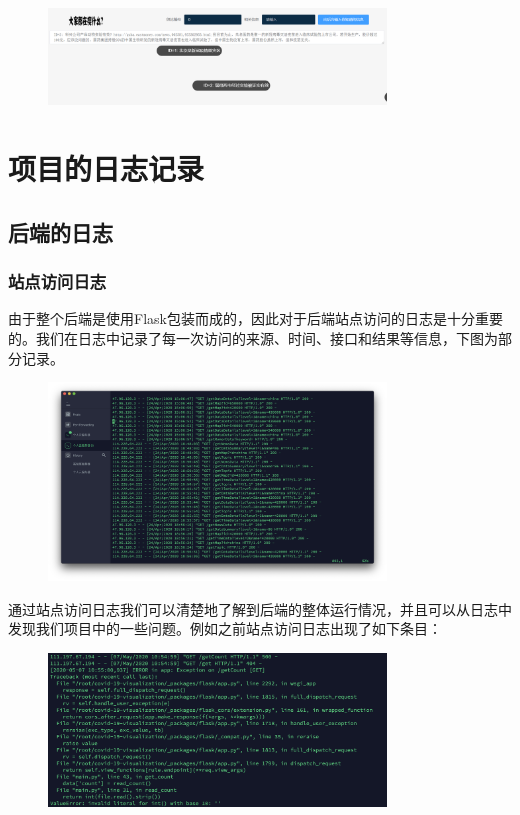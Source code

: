 \documentclass{article}
\begin{document}
\begin{figure}[H]
\centering
\includegraphics[width=0.8\textwidth]{pic7.png}
\end{figure}



\section{项目的日志记录}
\subsection{后端的日志}
\subsubsection{站点访问日志}
由于整个后端是使用Flask包装而成的，因此对于后端站点访问的日志是十分重要的。我们在日志中记录了每一次访问的来源、时间、接口和结果等信息，下图为部分记录。

\begin{figure}[H]
\centering
\includegraphics[width=0.8\textwidth]{pic2.png}
\end{figure}

通过站点访问日志我们可以清楚地了解到后端的整体运行情况，并且可以从日志中发现我们项目中的一些问题。例如之前站点访问日志出现了如下条目：

\begin{figure}[H]
\centering
\includegraphics[width=0.8\textwidth]{pic3.png}
\end{figure}
\end{document}
